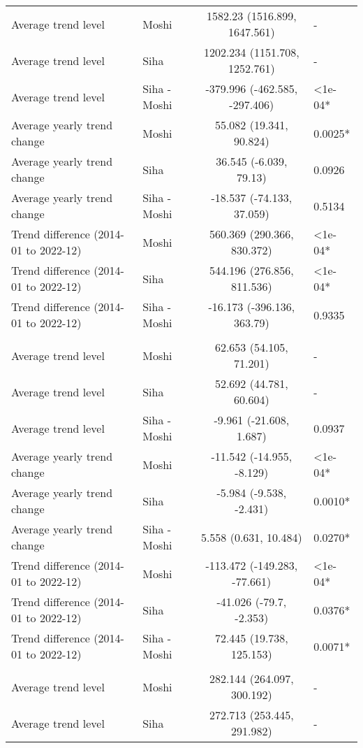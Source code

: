 \begin{longtable}{l|lcl}
Average trend level & Moshi & 1582.23 (1516.899, 1647.561) & - \\ 
Average trend level & Siha & 1202.234 (1151.708, 1252.761) & - \\ 
Average trend level & Siha - Moshi & -379.996 (-462.585, -297.406) & <1e-04* \\ 
Average yearly trend change & Moshi & 55.082 (19.341, 90.824) & 0.0025* \\ 
Average yearly trend change & Siha & 36.545 (-6.039, 79.13) & 0.0926 \\ 
Average yearly trend change & Siha - Moshi & -18.537 (-74.133, 37.059) & 0.5134 \\ 
Trend difference (2014-01 to 2022-12) & Moshi & 560.369 (290.366, 830.372) & <1e-04* \\ 
Trend difference (2014-01 to 2022-12) & Siha & 544.196 (276.856, 811.536) & <1e-04* \\ 
Trend difference (2014-01 to 2022-12) & Siha - Moshi & -16.173 (-396.136, 363.79) & 0.9335 \\ 
\midrule\addlinespace[2.5pt]
\multicolumn{4}{l}{Malnutrition} \\[2.5pt] 
\midrule\addlinespace[2.5pt]
Average trend level & Moshi & 62.653 (54.105, 71.201) & - \\ 
Average trend level & Siha & 52.692 (44.781, 60.604) & - \\ 
Average trend level & Siha - Moshi & -9.961 (-21.608, 1.687) & 0.0937 \\ 
Average yearly trend change & Moshi & -11.542 (-14.955, -8.129) & <1e-04* \\ 
Average yearly trend change & Siha & -5.984 (-9.538, -2.431) & 0.0010* \\ 
Average yearly trend change & Siha - Moshi & 5.558 (0.631, 10.484) & 0.0270* \\ 
Trend difference (2014-01 to 2022-12) & Moshi & -113.472 (-149.283, -77.661) & <1e-04* \\ 
Trend difference (2014-01 to 2022-12) & Siha & -41.026 (-79.7, -2.353) & 0.0376* \\ 
Trend difference (2014-01 to 2022-12) & Siha - Moshi & 72.445 (19.738, 125.153) & 0.0071* \\ 
\midrule\addlinespace[2.5pt]
\multicolumn{4}{l}{Diarrhea} \\[2.5pt] 
\midrule\addlinespace[2.5pt]
Average trend level & Moshi & 282.144 (264.097, 300.192) & - \\ 
Average trend level & Siha & 272.713 (253.445, 291.982) & - \\ 

\end{longtable}
